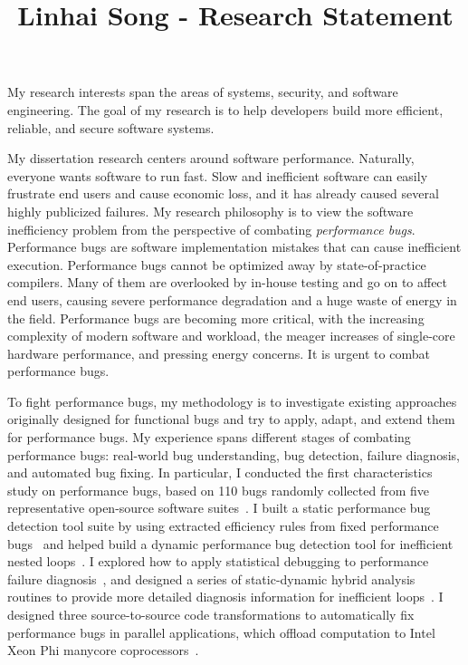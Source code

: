 \documentclass[10pt]{article}
\title{\vspace{-.7in}\bf{Linhai Song - Research Statement\vspace{-.4in}}}
\date{}
\begin{document}
\maketitle\vspace{-.2in}

My research interests span the areas of systems, security, and software engineering.
The goal of my research is to help developers build more efficient, reliable, and secure software systems.

My dissertation research centers around software performance. 
Naturally, everyone wants software to run fast. 
Slow and inefficient software can easily frustrate end users and cause economic loss,
and it has already caused several highly publicized failures. 
My research philosophy is to view the software inefficiency problem from the perspective of combating \textit{performance bugs}.
Performance bugs are software implementation mistakes that can cause inefficient execution.
Performance bugs cannot be optimized away by state-of-practice compilers. 
Many of them are overlooked by in-house testing and go on to affect end users, 
causing severe performance degradation and a huge waste of energy in the field. 
Performance bugs are becoming more critical, with the increasing complexity of modern software and workload, 
the meager increases of single-core hardware performance, 
and pressing energy concerns. 
It is urgent to combat performance bugs.

To fight performance bugs, my methodology is to investigate existing approaches originally
designed for functional bugs and try to apply, adapt, and extend them for performance bugs.
My experience spans different
stages of combating performance bugs: 
real-world bug understanding, bug detection,
failure diagnosis, and automated bug fixing.
In particular, 
I conducted the first characteristics study on performance bugs, 
based on 110 bugs randomly collected from five representative open-source software suites~\cite{jin12perfbug}.
I built a static performance bug detection tool suite by using extracted efficiency rules from fixed performance bugs~\cite{jin12perfbug} 
and helped build a dynamic performance bug detection tool for inefficient nested loops~\cite{Nistor13ICSE}. 
I explored how to apply statistical debugging to performance failure diagnosis~\cite{Song14OOPSLA}, 
and designed a series of static-dynamic hybrid analysis routines to provide more detailed diagnosis information for inefficient loops~\cite{Song17ICSE}.
I designed three source-to-source code transformations to automatically fix performance bugs in parallel applications, 
which offload computation to Intel Xeon Phi manycore coprocessors~\cite{Song14MICRO}. 
\end{document}

